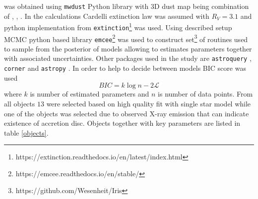 \documentclass{pracalicmgr}
\begin{document}
was obtained using \texttt{mwdust} \citep{bovy_galactic_2016} Python library with 3D dust map being combination of \citep{green_3d_2019}, \citep{greiner_unusually_2001},
\citep{drimmel_three-dimensional_2003}. In the calculations Cardelli extinction law was assumed \citep{cardelli_relationship_1989}
with $R_V=3.1$ 
and python implementation from \texttt{extinction}\footnote{https://extinction.readthedocs.io/en/latest/index.html} was used.
Using described setup MCMC python based library \texttt{emcee}\footnote{https://emcee.readthedocs.io/en/stable/} \citep{foreman-mackey_emcee_2013}
was used to construct set\footnote{https://github.com/Wesenheit/Iris} of routines used to sample from the posterior of models allowing to estimates parameters together
with associated uncertainties.
Other packages used in the study are \texttt{astroquery} \citep{ginsburg_astroquery_2019},
 \texttt{corner} \citep{foreman-mackey_cornerpy_2016} and \texttt{astropy} \citep{astropy_collaboration_astropy_2022}.
In order to help to decide between models 
BIC score was used 
\begin{equation}
    BIC=k\log{n}-2\mathcal{L}
\end{equation} where $k$ is number of estimated parameters and $n$ is  number of data points. From all objects $13$  were selected based on high quality fit with single star model while one of the objects was selected due to observed X-ray emission 
that can indicate existence of accretion disc. Objects together with key parameters are listed in table \ref{objects}.
\end{document}
